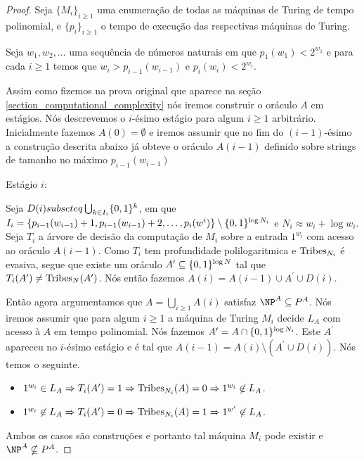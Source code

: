 \begin{proof}

Seja $\{M_{i}\}_{i \geq 1}$ uma enumeração de todas as máquinas de Turing de tempo polinomial, e $\{p_{i}\}_{i \geq 1}$ o tempo de execução das respectivas máquinas de Turing.

Seja $w_{1}, w_{2}, \dots$ uma sequência de números naturais em que $p_{1}(w_{1}) < 2^{w_{1}}$ e para cada $i \geq 1$ temos que $w_{i} > p_{i - 1}(w_{i - 1})$ e $p_{i}(w_{i}) < 2^{w_{i}}$.

Assim como fizemos na prova original que aparece na seção \ref{section_computational_complexity} nós iremos construir o oráculo $A$ em estágios. Nós descrevemos o $i$-ésimo estágio para algum $i \geq 1$ arbitrário. Inicialmente fazemos $A(0) = \emptyset$ e iremos assumir que no fim do $(i -1)$-ésimo a construção descrita abaixo já obteve o oráculo $A(i - 1)$ definido sobre strings de tamanho no máximo $p_{i - 1}(w_{i - 1})$

Estágio $i$:

Seja $D(i) subseteq \bigcup_{k \in I_{i}} \{0, 1\}^{k}$, em que $I_{i} = \{p_{i - 1}(w_{i - 1}) + 1, p_{i - 1}(w_{i - 1}) + 2, \dots, p_{i}(w^{i}) \} \setminus \{0, 1\}^{\log N_{i}}$ e $N_{i} \approx w_{i} + \log w_{i}$. Seja $T_{i}$ a árvore de decisão da computação de $M_{i}$ sobre a entrada $1^{w_{i}}$ com acesso ao oráculo $A(i - 1)$.  Como $T_{i}$ tem profundidade polilogaritmica e $\text{Tribes}_{N_{i}}$ é evasiva, segue que existe um oráculo $A^{\prime} \subseteq \{0, 1\}^{\log N}$ tal que $T_{i}(A^{\prime}) \neq \text{Tribes}_{N}(A^{\prime})$. Nós então fazemos $A(i) = A(i - 1) \cup A^{\prime} \cup D(i)$.

Então agora argumentamos que $A = \bigcup_{i \geq 1} A(i)$ satisfaz $\NP^{A} \subseteq P^{A}$. Nós iremos assumir que para algum $i \geq 1$ a máquina de Turing $M_{i}$ decide $L_{A}$ com acesso à $A$ em tempo polinomial. Nós fazemos $A^{\prime} = A \cap \{0, 1\}^{\log N_{i}}$. Este $A^{\prime}$ apareceu no $i$-ésimo estágio e é tal que $A(i - 1) = A(i) \setminus (A^{\prime} \cup D(i))$. Nós temos o seguinte.

\begin{itemize}

    \item $1^{w_{i}} \in L_{A} \Rightarrow T_{i}(A^{\prime}) = 1 \Rightarrow \text{Tribes}_{N_{i}}(A) = 0 \Rightarrow 1^{w_{i}} \not\in L_{A}$.

    \item $1^{w_{i}} \not\in L_{A} \Rightarrow T_{i}(A^{\prime}) = 0 \Rightarrow \text{Tribes}_{N_{i}}(A) = 1 \Rightarrow 1^{w^{i}} \not\in L_{A}$.

\end{itemize}

    Ambos os casos são construções e portanto tal máquina $M_{i}$ pode existir e $\NP^{A} \nsubseteq P^{A}$.

\end{proof}

